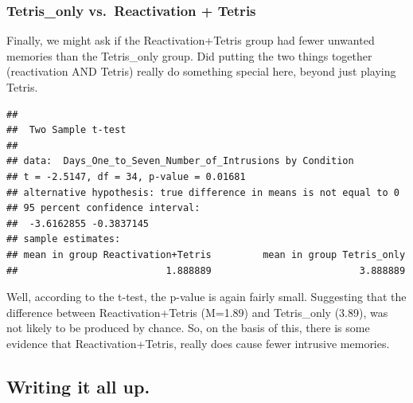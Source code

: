 \documentclass[]{book}
\newenvironment{Shaded}{\begin{snugshade}}{\end{snugshade}}
\newcommand{\KeywordTok}[1]{\textcolor[rgb]{0.13,0.29,0.53}{\textbf{#1}}}
\newcommand{\DataTypeTok}[1]{\textcolor[rgb]{0.13,0.29,0.53}{#1}}
\newcommand{\StringTok}[1]{\textcolor[rgb]{0.31,0.60,0.02}{#1}}
\newcommand{\OtherTok}[1]{\textcolor[rgb]{0.56,0.35,0.01}{#1}}
\newcommand{\OperatorTok}[1]{\textcolor[rgb]{0.81,0.36,0.00}{\textbf{#1}}}
\newcommand{\NormalTok}[1]{#1}
\begin{document}
\subsubsection{Tetris\_only vs.~Reactivation +
Tetris}\label{tetris_only-vs.reactivation-tetris}

Finally, we might ask if the Reactivation+Tetris group had fewer
unwanted memories than the Tetris\_only group. Did putting the two
things together (reactivation AND Tetris) really do something special
here, beyond just playing Tetris.

\begin{Shaded}
\end{Shaded}

\begin{verbatim}
## 
##  Two Sample t-test
## 
## data:  Days_One_to_Seven_Number_of_Intrusions by Condition
## t = -2.5147, df = 34, p-value = 0.01681
## alternative hypothesis: true difference in means is not equal to 0
## 95 percent confidence interval:
##  -3.6162855 -0.3837145
## sample estimates:
## mean in group Reactivation+Tetris         mean in group Tetris_only 
##                          1.888889                          3.888889
\end{verbatim}

Well, according to the t-test, the p-value is again fairly small.
Suggesting that the difference between Reactivation+Tetris (M=1.89) and
Tetris\_only (3.89), was not likely to be produced by chance. So, on the
basis of this, there is some evidence that Reactivation+Tetris, really
does cause fewer intrusive memories.

\subsection{Writing it all up.}\label{writing-it-all-up.}
\end{document}
